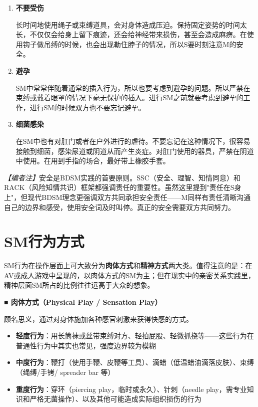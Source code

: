 \documentclass[12pt,UTF8]{ctexbook}
\begin{document}
\begin{enumerate}
	\item \textbf{不要受伤}

	长时间地使用绳子或束缚道具，会对身体造成压迫。保持固定姿势的时间太长，不仅仅会给身上留下痕迹，还会给神经带来损伤，甚至会造成麻痹。在使用钩子做吊缚的时候，也会出现勒住脖子的情况，所以S要时刻注意M的安全。

	\item \textbf{避孕}

	SM中常常伴随着通常的插入行为，所以也要考虑到避孕的问题。所以严禁在束缚或戴着眼罩的情况下毫无保护的插入。进行SM之前就要考虑到避孕的工作，进行SM的时候双方也不要忘记避孕。

	\item \textbf{细菌感染}

	在SM中也有对肛门或者在户外进行的虐待。不要忘记在这种情况下，很容易接触到细菌，感染尿道或阴道从而产生炎症。对肛门使用的器具，严禁在阴道中使用。在用到手指的场合，最好带上橡胶手套。
\end{enumerate}

\textit{【编者注】}安全是BDSM实践的首要原则。SSC（安全、理智、知情同意）和RACK（风险知情共识）框架都强调责任的重要性。虽然这里提到"责任在S身上"，但现代BDSM理念更强调双方共同承担安全责任——M同样有责任清晰沟通自己的边界和感受，使用安全词及时叫停。真正的安全需要双方共同努力。

\section{SM行为方式}

SM行为在操作层面上可大致分为\textbf{肉体方式}和\textbf{精神方式}两大类。值得注意的是：在AV或成人游戏中呈现的，以肉体方式的SM为主；但在现实中的亲密关系实践里，精神层面SM所占的比例往往远高于大众的想象。

\noindent\textbf{■ 肉体方式（Physical Play / Sensation Play）}

顾名思义，通过对身体施加各种感官刺激来获得快感的方式。

\begin{itemize}
	\item \textbf{轻度行为}：用长筒袜或丝带束缚对方、轻拍屁股、轻微抓挠等——这些行为在普通性行为中其实也常见，强度边界较为模糊
	\item \textbf{中度行为}：鞭打（使用手鞭、皮鞭等工具）、滴蜡（低温蜡油滴落皮肤）、束缚（绳缚/手铐/ spreader bar 等）
	\item \textbf{重度行为}：穿环（piercing play，临时或永久）、针刺（needle play，需专业知识和严格无菌操作）、以及其他可能造成实际组织损伤的行为
\end{itemize}
\end{document}
